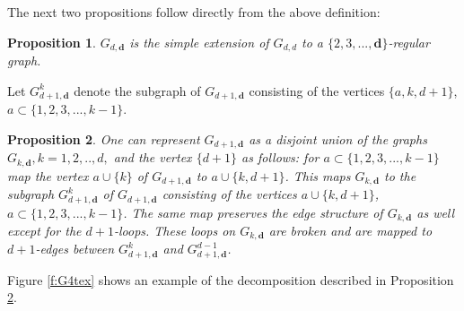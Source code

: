 \documentclass[11pt,a4paper]{article}
\newtheorem{proposition}{Proposition}[section]
\begin{document}
The next two propositions follow directly from the above definition:
\begin{proposition}\label{p:Gsimpleextensiontandem}
$G_{d,{\bm d}}$ 
is the simple extension of $G_{d,d}$
to a $\{2,3,...,{\bm d}\}$-regular graph.
\end{proposition}
Let
$G_{d+1,{\bm d}}^{k}$ denote the subgraph of $G_{d+1,{\bm d}}$ 
consisting of the vertices $\{a, k,d+1\}$, 
$a\subset \{1,2,3,...,k-1\}$. 
\begin{proposition}\label{p:embedding}
One can represent $G_{d+1,{\bm d}}$ as a disjoint union of the
graphs $G_{k,{\bm d}}, k=1,2,..,d,$ and the vertex $\{d+1\}$ as follows:
for $a \subset \{1,2,3,...,k-1\}$ map the vertex
$a \cup \{k\}$ of $G_{d+1,{\bm d}}$ to $a \cup \{k, d+1\}$.
This maps $G_{k,{\bm d}}$ to the 
subgraph $G_{d+1,{\bm d}}^{k}$ of $G_{d+1,{\bm d}}$ 
consisting of the vertices $a \cup\{ k,d+1\}$, 
$a\subset \{1,2,3,...,k-1\}$. 
The same map preserves 
the edge
structure of $G_{k,{\bm d}}$ as well except for the $d+1$-loops. These loops
on $G_{k,{\bm d}}$ are broken and are mapped to $d+1$-edges between
$G^{k}_{d+1,{\bm d}}$ and $G^{d-1}_{d+1,{\bm d}}$. 
\end{proposition}
Figure \ref{f:G4tex} shows an example of the
decomposition described in Proposition \ref{p:embedding}.
\end{document}
